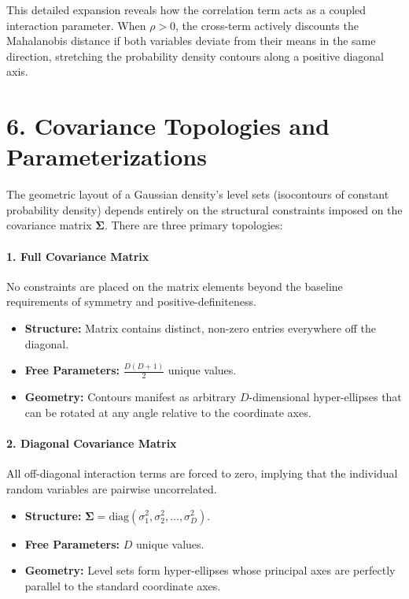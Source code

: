 \documentclass{article}
\begin{document}
This detailed expansion reveals how the correlation term acts as a coupled interaction parameter. When $\rho > 0$, the cross-term actively discounts the Mahalanobis distance if both variables deviate from their means in the same direction, stretching the probability density contours along a positive diagonal axis.

\section*{6. Covariance Topologies and Parameterizations}

The geometric layout of a Gaussian density's level sets (isocontours of constant probability density) depends entirely on the structural constraints imposed on the covariance matrix $\boldsymbol{\Sigma}$. There are three primary topologies:

\paragraph{1. Full Covariance Matrix}
No constraints are placed on the matrix elements beyond the baseline requirements of symmetry and positive-definiteness.
\begin{itemize}
    \item \textbf{Structure:} Matrix contains distinct, non-zero entries everywhere off the diagonal.
    \item \textbf{Free Parameters:} $\frac{D(D + 1)}{2}$ unique values.
    \item \textbf{Geometry:} Contours manifest as arbitrary $D$-dimensional hyper-ellipses that can be rotated at any angle relative to the coordinate axes.
\end{itemize}

\paragraph{2. Diagonal Covariance Matrix}
All off-diagonal interaction terms are forced to zero, implying that the individual random variables are pairwise uncorrelated.
\begin{itemize}
    \item \textbf{Structure:} $\boldsymbol{\Sigma} = \text{diag}(\sigma_1^2, \sigma_2^2, \dots, \sigma_D^2)$.
    \item \textbf{Free Parameters:} $D$ unique values.
    \item \textbf{Geometry:} Level sets form hyper-ellipses whose principal axes are perfectly parallel to the standard coordinate axes.
\end{itemize}
\end{document}
